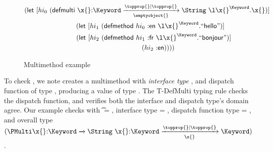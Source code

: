 \begin{figure}
\begin{gather*}
\letexp{hi_0} {\createmultiexp {\ArrowOne{\x{}}{\Keyword}{\String}{\filterset{\topprop{}}{\topprop{}}}{\emptyobject{}}} {\abs{\x{}}{\Keyword}{\x{}}}}
  {\\\text{\quad}
    \letexp{hi_1} {\extendmultiexp {hi_0} {\makekw{en}} {\abs {\x{}} {\Keyword} {\makestr{hello}}}}
      {\\\text{\quad\quad}
        \letexp{hi_2} {\extendmultiexp {hi_1} {\makekw{fr}} {\abs {\x{}} {\Keyword} {\makestr{bonjour}}}}
        {\\\text{\quad\quad\quad
          \appexp{hi_2}{\makekw{en}}}}}}
\end{gather*}
\caption{Multimethod example}
\label{main:figure:mmexample}
\end{figure}
%
%
%
%
To check 
{\createmultiexp {\ArrowTwo{\x{}}{\Keyword}{\String}} {\abs{\x{}}{\Keyword}{\x{}}}},
%
we note
{\createmultiexp {\s{}} {\e{}}} creates a multimethod with \emph{interface type} \s{}, and dispatch function \e{}
of type \sp{},
producing a value of type
{\MultiFntype {\s{}} {\sp{}}}. %
The T-DefMulti typing rule checks the dispatch function, and
verifies both the interface and dispatch type's domain agree.
Our example checks with \t{} = \Keyword, interface type \s{} = {\ArrowTwo{\x{}}{\Keyword}{\String}},
dispatch function type \sp{} = {\ArrowOne{\x{}}{\Keyword}{\Keyword}{\filterset{\topprop{}}{\topprop{}}}{\x{}}}, and overall type
$
{\MultiFntype {\ArrowTwo{\x{}}{\Keyword}{\String}}
              {\ArrowOne{\x{}}{\Keyword}{\Keyword}{\filterset{\topprop{}}{\topprop{}}}{\x{}}}}
$.

